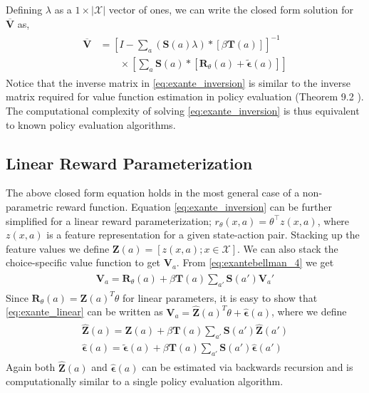 \documentclass{article}
\begin{document}
Defining $\lambda$ as a $1\times|\mathcal{X}|$ vector of ones, we can write the closed form solution for $\overline{\mathbf{V}}$ as,
\begin{align} \label{eq:exante_inversion}
\begin{split}
\overline{\mathbf{V}} &=\left[I-\sum_{a}(\mathbf{S}(a) \lambda) *\left[ \beta \mathbf{T}(a)  \right]\right]^{-1} \\
& \qquad \times \left[\sum_{a}\mathbf{S}(a) *\left[ \mathbf{R}_{\theta}(a)+\tilde{\bm{\epsilon}}(a)\right]\right]
\end{split}
\end{align}
Notice that the inverse matrix in \eqref{eq:exante_inversion} is similar to the inverse matrix required for value function estimation in policy evaluation (Theorem 9.2 \cite{ziebart_phd}). The computational complexity of solving \eqref{eq:exante_inversion} is thus equivalent to known policy evaluation algorithms. 


\subsection{Linear Reward Parameterization}

The above closed form equation holds in the most general case of a non-parametric reward function. Equation \eqref{eq:exante_inversion} can be further simplified for a linear reward parameterization; $r_{\theta}(x,a) = \theta^{\top} z(x,a)$, where $z(x, a)$ is a feature representation for a given state-action pair. Stacking up the feature values we define $\mathbf{Z}(a) = [z(x, a); x \in \mathcal{X}]$. We can also stack the choice-specific value function to get $\mathbf{V}_a$. From \eqref{eq:exantebellman_4} we get
\begin{align} \label{eq:exante_linear}
    \begin{split}
    \mathbf{V}_a=\mathbf{R}_{\theta}(a)+\beta \mathbf{T}(a) \sum_{a'}\mathbf{S}(a')\mathbf{V}_a'
    \end{split}
\end{align}
Since $\mathbf{R}_{\theta}(a) = \mathbf{Z}(a)^T\theta$ for linear parameters, it is easy to show that \eqref{eq:exante_linear} can be written as $\mathbf{V}_a = \hat{\mathbf{Z}}(a)^T\theta + \hat{\bm{\epsilon}}(a)$, where we define
\begin{align} \label{eq:choice_specific_Z_tilde}
\begin{split}
    \hat{\mathbf{Z}}(a) = \mathbf{Z}(a) + \beta\mathbf{T}(a)\sum_{a'}\mathbf{S}(a')\hat{\mathbf{Z}}(a') \\
    \hat{\bm{\epsilon}}(a) = \tilde{\bm{\epsilon}}(a) + \beta\mathbf{T}(a)\sum_{a'}\mathbf{S}(a')\hat{\bm{\epsilon}}(a')
\end{split}    
\end{align}
Again both $\hat{\mathbf{Z}}(a)$ and $\hat{\bm{\epsilon}}(a)$ can be estimated via backwards recursion and is computationally similar to a single policy evaluation algorithm.
\end{document}
